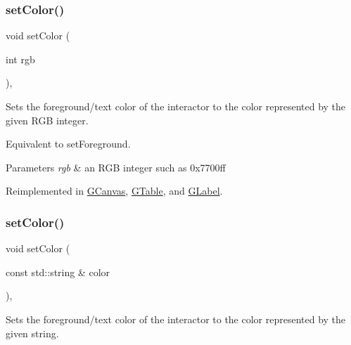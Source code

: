 \subsubsection{\texorpdfstring{set\+Color()}{setColor()}\hspace{0.1cm}{\footnotesize\ttfamily [1/2]}}
{\footnotesize\ttfamily void set\+Color (\begin{DoxyParamCaption}\item[{int}]{rgb }\end{DoxyParamCaption})\hspace{0.3cm}{\ttfamily [virtual]}, {\ttfamily [inherited]}}



Sets the foreground/text color of the interactor to the color represented by the given R\+GB integer. 

Equivalent to set\+Foreground. 
\begin{DoxyParams}{Parameters}
{\em rgb} & an R\+GB integer such as 0x7700ff \\
\hline
\end{DoxyParams}


Reimplemented in \mbox{\hyperlink{classsgl_1_1GCanvas_af6e1bcf23a09a0ae0607daff81ee45fa}{G\+Canvas}}, \mbox{\hyperlink{classsgl_1_1GTable_a165735fb49fa7db12602d32557cbfe0d}{G\+Table}}, and \mbox{\hyperlink{classsgl_1_1GLabel_a165735fb49fa7db12602d32557cbfe0d}{G\+Label}}.

\mbox{\label{classsgl_1_1GInteractor_a61374df6c11b52cfbb0815decdbaebc6}} 
\subsubsection{\texorpdfstring{set\+Color()}{setColor()}\hspace{0.1cm}{\footnotesize\ttfamily [2/2]}}
{\footnotesize\ttfamily void set\+Color (\begin{DoxyParamCaption}\item[{const std\+::string \&}]{color }\end{DoxyParamCaption})\hspace{0.3cm}{\ttfamily [virtual]}, {\ttfamily [inherited]}}



Sets the foreground/text color of the interactor to the color represented by the given string. 


